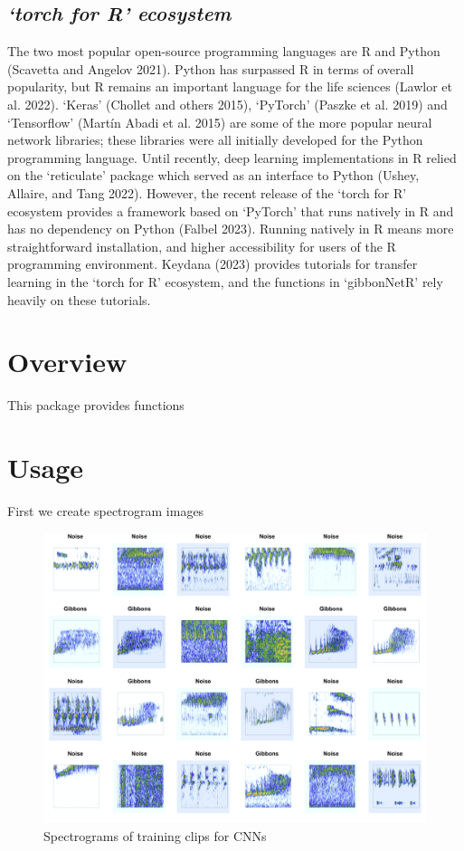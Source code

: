 \documentclass{article}
\begin{document}
\hypertarget{torch-for-r-ecosystem}{%
\subsection{\texorpdfstring{\emph{`torch for R'
ecosystem}}{`torch for R' ecosystem}}\label{torch-for-r-ecosystem}}

The two most popular open-source programming languages are R and Python
(Scavetta and Angelov 2021). Python has surpassed R in terms of overall
popularity, but R remains an important language for the life sciences
(Lawlor et al. 2022). `Keras' (Chollet and others 2015), `PyTorch'
(Paszke et al. 2019) and `Tensorflow' (Martín Abadi et al. 2015) are
some of the more popular neural network libraries; these libraries were
all initially developed for the Python programming language. Until
recently, deep learning implementations in R relied on the `reticulate'
package which served as an interface to Python (Ushey, Allaire, and Tang
2022). However, the recent release of the `torch for R' ecosystem
provides a framework based on `PyTorch' that runs natively in R and has
no dependency on Python (Falbel 2023). Running natively in R means more
straightforward installation, and higher accessibility for users of the
R programming environment. Keydana (2023) provides tutorials for
transfer learning in the `torch for R' ecosystem, and the functions in
`gibbonNetR' rely heavily on these tutorials.

\hypertarget{overview}{%
\section{Overview}\label{overview}}

This package provides functions

\hypertarget{usage}{%
\section{Usage}\label{usage}}

First we create spectrogram images

\begin{figure}[ht]

{\centering \includegraphics[width=0.75\linewidth]{../README_files/spectro} 

}

\caption{Spectrograms of training clips for CNNs}\label{fig:unnamed-chunk-1}
\end{figure}
\end{document}
